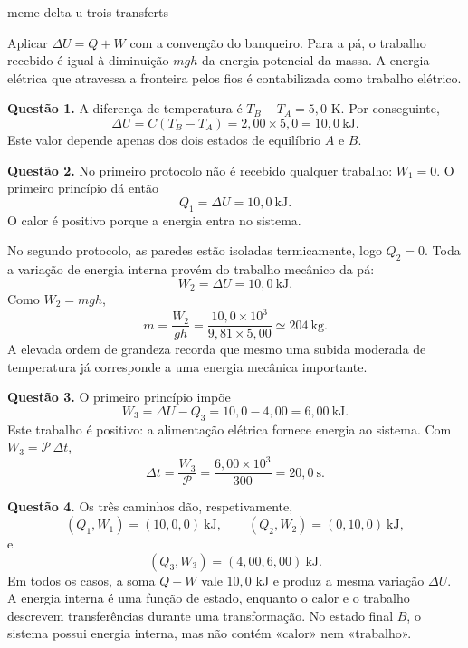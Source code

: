 \begin{exo}{meme-delta-u-trois-transferts}
\begin{indication}
Aplicar $\Delta U=Q+W$ com a convenção do banqueiro. Para a pá, o trabalho
recebido é igual à diminuição $mgh$ da energia potencial da massa. A energia
elétrica que atravessa a fronteira pelos fios é contabilizada como trabalho elétrico.
\end{indication}

\begin{solution}
\textbf{Questão 1.} A diferença de temperatura é $T_B-T_A=5{,}0$ K. Por conseguinte,
\[\Delta U=C(T_B-T_A)=2{,}00\times5{,}0=10{,}0\ \mathrm{kJ}.\]
Este valor depende apenas dos dois estados de equilíbrio $A$ e $B$.

\textbf{Questão 2.} No primeiro protocolo não é recebido qualquer trabalho:
$W_1=0$. O primeiro princípio dá então
\[Q_1=\Delta U=10{,}0\ \mathrm{kJ}.\]
O calor é positivo porque a energia entra no sistema.

No segundo protocolo, as paredes estão isoladas termicamente, logo $Q_2=0$.
Toda a variação de energia interna provém do trabalho mecânico da pá:
\[W_2=\Delta U=10{,}0\ \mathrm{kJ}.\]
Como $W_2=mgh$,
\[m=\frac{W_2}{gh}=\frac{10{,}0\times10^3}{9{,}81\times5{,}00}\simeq204\ \mathrm{kg}.\]
A elevada ordem de grandeza recorda que mesmo uma subida moderada de temperatura
já corresponde a uma energia mecânica importante.

\textbf{Questão 3.} O primeiro princípio impõe
\[W_3=\Delta U-Q_3=10{,}0-4{,}00=6{,}00\ \mathrm{kJ}.\]
Este trabalho é positivo: a alimentação elétrica fornece energia ao sistema.
Com $W_3=\mathcal P\,\Delta t$,
\[\Delta t=\frac{W_3}{\mathcal P}=\frac{6{,}00\times10^3}{300}=20{,}0\ \mathrm{s}.\]

\textbf{Questão 4.} Os três caminhos dão, respetivamente,
\[(Q_1,W_1)=(10{,}0,0)\ \mathrm{kJ},\qquad(Q_2,W_2)=(0,10{,}0)\ \mathrm{kJ},\]
e
\[(Q_3,W_3)=(4{,}00,6{,}00)\ \mathrm{kJ}.\]
Em todos os casos, a soma $Q+W$ vale $10{,}0$ kJ e produz a mesma variação
$\Delta U$. A energia interna é uma função de estado, enquanto o calor e o
trabalho descrevem transferências durante uma transformação. No estado final
$B$, o sistema possui energia interna, mas não contém «calor» nem «trabalho».
\end{solution}
\end{exo}

